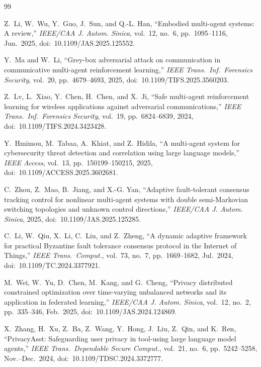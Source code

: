 \documentclass[conference]{IEEEtran}
\begin{document}
\begin{thebibliography}{99}

Z.~Li, W.~Wu, Y.~Guo, J.~Sun, and Q.-L. Han,
``Embodied multi-agent systems: A review,''
\textit{IEEE/CAA J. Autom. Sinica}, vol.~12, no.~6,
pp.~1095--1116, Jun.~2025,
doi:~10.1109/JAS.2025.125552.

Y.~Ma and W.~Li,
``Grey-box adversarial attack on communication in communicative
multi-agent reinforcement learning,''
\textit{IEEE Trans.\ Inf.\ Forensics Security}, vol.~20,
pp.~4679--4693, 2025,
doi:~10.1109/TIFS.2025.3560203.

Z.~Lv, L.~Xiao, Y.~Chen, H.~Chen, and X.~Ji,
``Safe multi-agent reinforcement learning for wireless applications
against adversarial communications,''
\textit{IEEE Trans.\ Inf.\ Forensics Security}, vol.~19,
pp.~6824--6839, 2024,
doi:~10.1109/TIFS.2024.3423428.

Y.~Hmimou, M.~Tabaa, A.~Khiat, and Z.~Hidila,
``A multi-agent system for cybersecurity threat detection and
correlation using large language models,''
\textit{IEEE Access}, vol.~13, pp.~150199--150215, 2025,
doi:~10.1109/ACCESS.2025.3602681.

C.~Zhou, Z.~Mao, B.~Jiang, and X.-G. Yan,
``Adaptive fault-tolerant consensus tracking control for nonlinear
multi-agent systems with double semi-Markovian switching topologies
and unknown control directions,''
\textit{IEEE/CAA J. Autom. Sinica}, 2025,
doi:~10.1109/JAS.2025.125285.

C.~Li, W.~Qiu, X.~Li, C.~Liu, and Z.~Zheng,
``A dynamic adaptive framework for practical Byzantine fault tolerance
consensus protocol in the Internet of Things,''
\textit{IEEE Trans.\ Comput.}, vol.~73, no.~7,
pp.~1669--1682, Jul.~2024,
doi:~10.1109/TC.2024.3377921.

M.~Wei, W.~Yu, D.~Chen, M.~Kang, and G.~Cheng,
``Privacy distributed constrained optimization over time-varying
unbalanced networks and its application in federated learning,''
\textit{IEEE/CAA J. Autom. Sinica}, vol.~12, no.~2,
pp.~335--346, Feb.~2025,
doi:~10.1109/JAS.2024.124869.

X.~Zhang, H.~Xu, Z.~Ba, Z.~Wang, Y.~Hong, J.~Liu, Z.~Qin,
and K.~Ren,
``PrivacyAsst: Safeguarding user privacy in tool-using large language
model agents,''
\textit{IEEE Trans.\ Dependable Secure Comput.}, vol.~21, no.~6,
pp.~5242--5258, Nov.--Dec.~2024,
doi:~10.1109/TDSC.2024.3372777.


\end{thebibliography}
\end{document}
